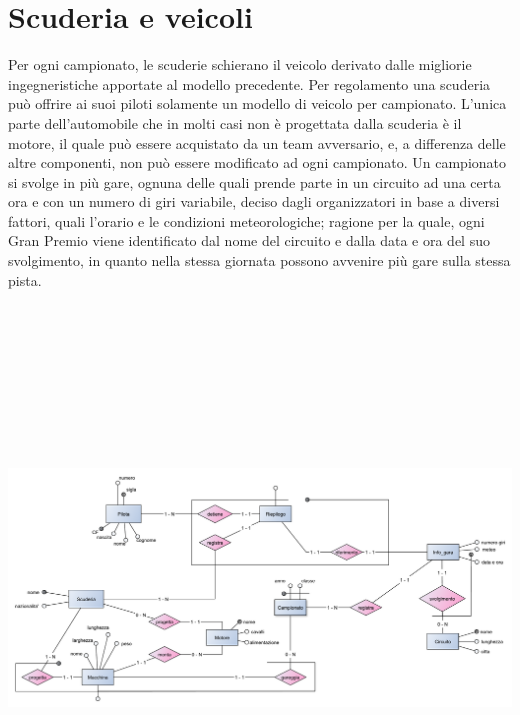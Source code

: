 \documentclass[a4paper,12pt]{report}
\begin{document}
		\section{Scuderia e veicoli}
	{\fontsize{12.5}{20}\selectfont
	Per ogni campionato, le scuderie schierano il veicolo derivato dalle migliorie ingegneristiche apportate al modello
	precedente. Per regolamento una scuderia può offrire ai suoi piloti solamente un modello di veicolo per campionato.
	L'unica parte dell'automobile che in molti casi non è progettata dalla scuderia è il motore, il quale può essere
	acquistato da un team avversario, e, a differenza delle altre componenti, non può essere modificato ad ogni campionato.
	Un campionato si svolge in più gare, ognuna delle quali prende parte in un circuito ad una certa ora e con un numero
	di giri variabile, deciso dagli organizzatori in base a diversi fattori, quali l'orario e le condizioni meteorologiche; ragione per la quale, ogni Gran Premio viene identificato dal nome del circuito e dalla data e ora del suo svolgimento, in quanto nella stessa giornata possono avvenire più gare sulla stessa pista.}
	\pagebreak
	\begin{center}
		\hspace*{-2cm}%
		\includegraphics[width=\dimexpr\textwidth+10cm\relax, height=15cm, angle=90]{copies/scheletro2.pdf}%
		\hspace*{-4cm}%
	\end{center}
	\pagebreak
\end{document}
